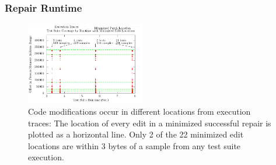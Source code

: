 \documentclass{sigcomm-alternate}
\begin{document}
\subsubsection{Repair Runtime}
\label{runtime}



\begin{figure}[htb]
  \centering
  \includegraphics[width=0.46\textwidth]{ts-cov-and-runtime-w-min.pdf}  
  \caption{Code modifications occur in different locations from
    execution traces: The location of every edit in a minimized
    successful repair is plotted as a horizontal line.  Only 2 of the
    22 minimized edit locations are within 3 bytes of a sample from
    any test suite execution. }
  \label{ts-cov-rt-w-min}
\end{figure}
\end{document}
